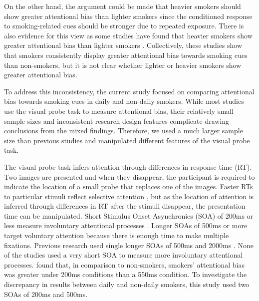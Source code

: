 \documentclass[empirical, authordate]{jote-new-article}
\begin{document}
On the other hand, the argument could be made that heavier smokers should show greater attentional bias than lighter smokers since the conditioned response to smoking-related cues should be stronger due to repeated exposure. There is also evidence for this view as some studies have found that heavier smokers show greater attentional bias than lighter smokers \parencite{Chanon2010, Vollstädt-Klein2011, Zack2001}. Collectively, these studies show that smokers consistently display greater attentional bias towards smoking cues than non-smokers, but it is not clear whether lighter or heavier smokers show greater attentional bias.

To address this inconsistency, the current study focused on comparing attentional bias towards smoking cues in daily and non-daily smokers. While most studies use the visual probe task to measure attentional bias, their relatively small sample sizes and inconsistent research design features complicate drawing conclusions from the mixed findings. Therefore, we used a much larger sample size than previous studies and manipulated different features of the visual probe task.

The visual probe task infers attention through differences in response time (RT). Two images are presented and when they disappear, the participant is required to indicate the location of a small probe that replaces one of the images. Faster RTs to particular stimuli reflect selective attention \parencite{Field2008}, but as the location of attention is inferred through differences in RT after the stimuli disappear, the presentation time can be manipulated. Short Stimulus Onset Asynchronies (SOA) of 200ms or less measure involuntary attentional processes \parencite{Field2008}. Longer SOAs of 500ms or more target voluntary attention because there is enough time to make multiple fixations. Previous research used single longer SOAs of 500ms \parencite{Vollstädt-Klein2011} and 2000ms \parencite{Hogarth2003, Mogg2005}. None of the studies used a very short SOA to measure more involuntary attentional processes. \textcite{Chanon2010} found that, in comparison to non-smokers, smokers' attentional bias was greater under 200ms conditions than a 550ms condition. To investigate the discrepancy in results between daily and non-daily smokers, this study used two SOAs of 200ms and 500ms.
\end{document}
